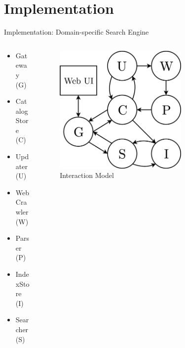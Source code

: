 \documentclass{beamer}
\begin{document}

\section{Implementation}


\begin{frame}{Implementation: Domain-specific Search Engine}

\begin{columns}
  \begin{column}{0.47\textwidth}
    \begin{itemize}
      \item Gateway (G) 
      \item CatalogStore (C)
      \item Updater (U)
      \item Web Crawler (W)
      \item Parser (P)
      \item IndexStore (I)
      \item Searcher (S)
    \end{itemize}
  \end{column}
  \begin{column}{0.5\textwidth}
    \begin{figure} 
      \includegraphics[width=0.7\textwidth]{graphics/interaction-model.png} 
      \caption{Interaction Model}
    \end{figure}
  \end{column}
\end{columns}

\end{frame}
\end{document}
